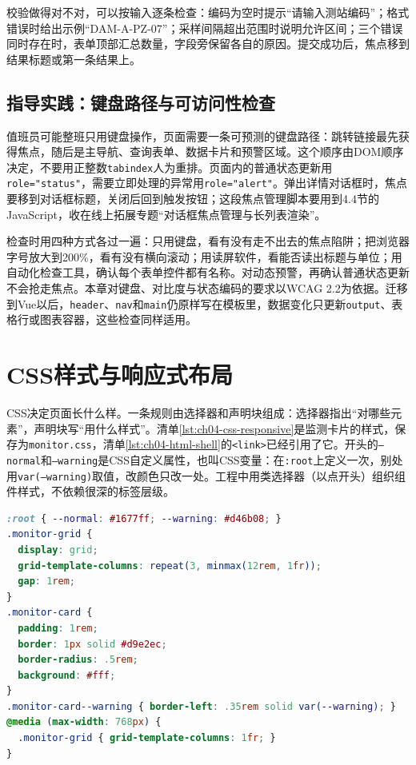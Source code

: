 校验做得对不对，可以按输入逐条检查：编码为空时提示“请输入测站编码”；格式错误时给出示例“DAM-A-PZ-07”；采样间隔超出范围时说明允许区间；三个错误同时存在时，表单顶部汇总数量，字段旁保留各自的原因。提交成功后，焦点移到结果标题或第一条结果上。

\subsection{指导实践：键盘路径与可访问性检查}

值班员可能整班只用键盘操作，页面需要一条可预测的键盘路径：跳转链接最先获得焦点，随后是主导航、查询表单、数据卡片和预警区域。这个顺序由DOM顺序决定，不要用正整数\texttt{tabindex}人为重排。页面内的普通状态更新用\texttt{role="status"}，需要立即处理的异常用\texttt{role="alert"}。弹出详情对话框时，焦点要移到对话框标题，关闭后回到触发按钮；这段焦点管理脚本要用到4.4节的JavaScript，收在线上拓展专题“对话框焦点管理与长列表渲染”。

检查时用四种方式各过一遍：只用键盘，看有没有走不出去的焦点陷阱；把浏览器字号放大到200\%，看有没有横向滚动；用读屏软件，看能否读出标题与单位；用自动化检查工具，确认每个表单控件都有名称。对动态预警，再确认普通状态更新不会抢走焦点。本章对键盘、对比度与状态编码的要求以WCAG 2.2为依据\cite{wcag22}。迁移到Vue以后，\texttt{header}、\texttt{nav}和\texttt{main}仍原样写在模板里，数据变化只更新\texttt{output}、表格行或图表容器，这些检查同样适用。

\section{CSS样式与响应式布局}


CSS决定页面长什么样。一条规则由选择器和声明块组成：选择器指出“对哪些元素”，声明块写“用什么样式”。清单\ref{lst:ch04-css-responsive}是监测卡片的样式，保存为\texttt{monitor.css}，清单\ref{lst:ch04-html-shell}的\texttt{<link>}已经引用了它。开头的\texttt{--normal}和\texttt{--warning}是CSS自定义属性，也叫CSS变量：在\texttt{:root}上定义一次，别处用\texttt{var(--warning)}取值，改颜色只改一处。工程中用类选择器（以点开头）组织组件样式，不依赖很深的标签层级。

\begin{lstlisting}[label={lst:ch04-css-responsive},language=CSS,caption={监测卡片响应式样式}]
:root { --normal: #1677ff; --warning: #d46b08; }
.monitor-grid {
  display: grid;
  grid-template-columns: repeat(3, minmax(12rem, 1fr));
  gap: 1rem;
}
.monitor-card {
  padding: 1rem;
  border: 1px solid #d9e2ec;
  border-radius: .5rem;
  background: #fff;
}
.monitor-card--warning { border-left: .35rem solid var(--warning); }
@media (max-width: 768px) {
  .monitor-grid { grid-template-columns: 1fr; }
}
\end{lstlisting}

